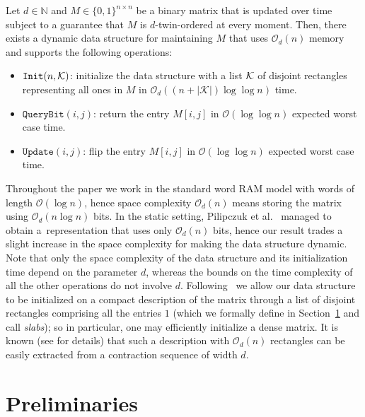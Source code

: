 \documentclass[runningheads]{llncs}
\newcommand{\Oh}{\mathcal{O}}
\begin{document}
\begin{theorem}\label{thm:main}
	Let $d\in \mathbb{N}$ and $M \in \{0,1\}^{n \times n}$ be a binary matrix
	that is updated over time subject to a guarantee that $M$ is
	$d$-twin-ordered at every moment. Then, there exists a dynamic data
	structure for maintaining $M$ that uses $\Oh_d(n)$ memory and supports
	the following operations:
	\begin{itemize}
		\item $\mathtt{Init}(n, \cal K)$: initialize the data structure
		with a list $\cal K$ of disjoint rectangles representing all ones
		in $M$ in $\Oh_d((n + |{\mathcal{K}}|) \log \log n)$ time.
		\item $\mathtt{QueryBit}(i,j)$: return the
		entry $M[i, j]$ in $\Oh(\log \log n)$ expected worst case
		time.
\item $\mathtt{Update}(i, j)$: flip the entry $M[i, j]$
		in $\Oh(\log \log n)$ expected worst case time.
	\end{itemize}
\end{theorem}

Throughout the paper we work in the standard word RAM model with words
of length $\Oh(\log n)$, hence space complexity $\Oh_d(n)$ means storing
the matrix using \linebreak$\Oh_d(n \log n)$ bits. 
In the static setting,
Pilipczuk et al.~\cite{tww-repr} managed to obtain a~representation that
uses only $\Oh_d(n)$ bits, hence our result trades a slight increase in the space complexity for making the data structure dynamic.
Note that only the space complexity of the data structure and
its initialization time depend on the parameter $d$, whereas the
bounds on the time complexity of all the other operations do not
involve $d$.
Following~\cite{tww-repr} we allow our data structure to be
initialized on a compact description of the matrix through a list
of disjoint rectangles comprising all the entries $1$ (which we formally define in Section~\ref{sec:preliminaries} and call {\em{slabs}}); so in
particular, one may efficiently initialize a dense matrix. 
It is known (see \cite[Lemma~10]{tww-repr} for details) that such a
description with $\Oh_d(n)$ rectangles can be easily extracted
from a contraction sequence of width $d$.










 

\section{Preliminaries}
\label{sec:preliminaries}
\end{document}
